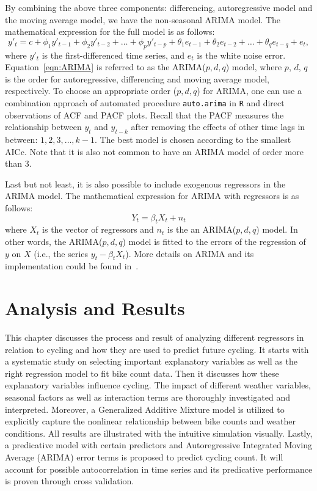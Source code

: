 \documentclass [11pt, proquest] {uwthesis}[2015/03/03]
\begin{document}
By combining the above three components: differencing, autoregressive model and the moving average model, we have the non-seasonal ARIMA model. The mathematical expression for the full model is as follows:
\begin{equation}
y'_t = c + \phi_1 y'_{t-1} + \phi_2 y'_{t-2} + \hdots + \phi_p y'_{t-p} + \theta_1 e_{t-1} + \theta_2 e_{t-2} + \hdots + \theta_q e_{t-q} + e_t, \label{eqn:ARIMA}
\end{equation}
where $y'_t$ is the first-differenced time series, and $e_t$ is the white noise error. Equation~\eqref{eqn:ARIMA} is referred to as the ARIMA($p,d,q$) model, where $p$, $d$, $q$ is the order for autoregressive, differencing and moving average model, respectively. To choose an appropriate order ($p,d,q$) for ARIMA, one can use a combination approach of automated procedure \texttt{auto.arima} in \texttt{R} and direct observations of ACF and PACF plots. Recall that the PACF measures the relationship between $y_t$ and $y_{t-k}$ after removing the effects of other time lags in between: $1, 2, 3, \hdots, k-1$. The best model is chosen according to the smallest AICc. Note that it is also not common to have an ARIMA model of order more than 3.

Last but not least, it is also possible to include exogenous regressors in the ARIMA model. The mathematical expression for ARIMA with regressors is as follows:
\[Y_t = \beta_t X_t + n_t\]
where $X_t$ is the vector of regressors and $n_t$ is the an ARIMA($p,d,q$) model. In other words, the ARIMA($p,d,q$) model is fitted to the errors of the regression of $y$ on $X$ (i.e., the series $y_t - \beta_t X_t$). More details on ARIMA and its implementation could be found in~\cite{Hall11}.


 
\chapter{Analysis and Results}

This chapter discusses the process and result of analyzing different regressors in relation to cycling and how they are used to predict future cycling. It starts with a systematic study on selecting important explanatory variables as well as the right regression model to fit bike count data. Then it discusses how these explanatory variables influence cycling. The impact of different weather variables, seasonal factors as well as interaction terms are thoroughly investigated and interpreted. Moreover, a Generalized  Additive Mixture model is utilized to explicitly capture the nonlinear relationship between bike counts and weather conditions. All results are illustrated with the intuitive simulation visually. Lastly, a predicative model with certain predictors and Autoregressive Integrated Moving Average (ARIMA) error terms is proposed to predict cycling count. It will account for possible autocorrelation in time series and its predicative performance is proven through cross validation.
\end{document}
